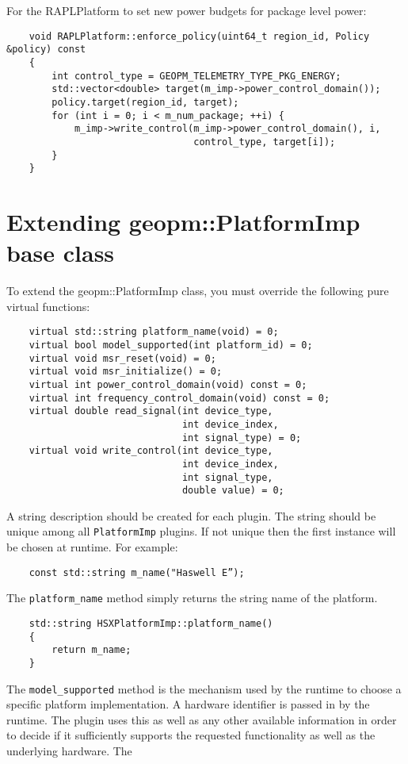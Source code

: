 \documentclass[11pt]{article}
\begin{document}
For the RAPLPlatform to set new power budgets for package level power:
\begin{verbatim}
    void RAPLPlatform::enforce_policy(uint64_t region_id, Policy &policy) const
    {
        int control_type = GEOPM_TELEMETRY_TYPE_PKG_ENERGY;
        std::vector<double> target(m_imp->power_control_domain());
        policy.target(region_id, target);
        for (int i = 0; i < m_num_package; ++i) {
            m_imp->write_control(m_imp->power_control_domain(), i,
                                 control_type, target[i]);
        }
    }
\end{verbatim}
\section{Extending geopm::PlatformImp base class}
To extend the geopm::PlatformImp class, you must override the
following pure virtual functions:
\begin{verbatim}
    virtual std::string platform_name(void) = 0;
    virtual bool model_supported(int platform_id) = 0;
    virtual void msr_reset(void) = 0;
    virtual void msr_initialize() = 0;
    virtual int power_control_domain(void) const = 0;
    virtual int frequency_control_domain(void) const = 0;
    virtual double read_signal(int device_type,
                               int device_index,
                               int signal_type) = 0;
    virtual void write_control(int device_type,
                               int device_index,
                               int signal_type,
                               double value) = 0;
\end{verbatim}
A string description should be created for each plugin. The string
should be unique among all \verb#PlatformImp# plugins. If not unique
then the first instance will be chosen at runtime. For example:
\begin{verbatim}
    const std::string m_name("Haswell E”);
\end{verbatim}
The \verb#platform_name# method simply returns the string name of the
platform.
\begin{verbatim}
    std::string HSXPlatformImp::platform_name()
    {
        return m_name;
    }
\end{verbatim}
The \verb#model_supported# method is the mechanism used by the runtime
to choose a specific platform implementation. A hardware identifier is
passed in by the runtime. The plugin uses this as well as any other
available information in order to decide if it sufficiently supports
the requested functionality as well as the underlying hardware. The
\end{document}
